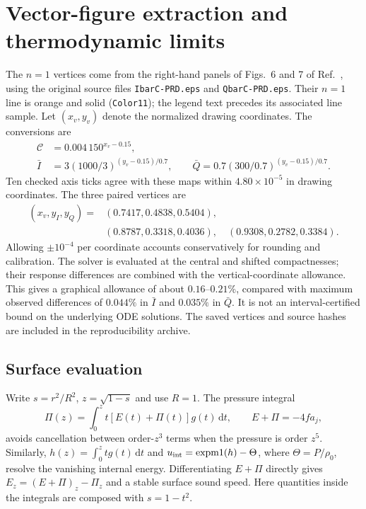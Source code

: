 \documentclass[10pt,a4paper]{article}
\newcommand{\dd}{\mathrm d}
\begin{document}
\clearpage
\section{Vector-figure extraction and thermodynamic limits}
The $n=1$ vertices come from the right-hand panels of Figs.~6 and 7 of Ref.~\cite{yy}, using the original source files \texttt{IbarC-PRD.eps} and \texttt{QbarC-PRD.eps}. Their $n=1$ line is orange and solid (\texttt{Color11}); the legend text precedes its associated line sample. Let $(x_v,y_v)$ denote the normalized drawing coordinates. The conversions are
\begin{align}
 \mathcal C&=0.004\,150^{x_v-0.15},\\
 \bar I&=3(1000/3)^{(y_v-0.15)/0.7},\qquad
 \bar Q=0.7(300/0.7)^{(y_v-0.15)/0.7}.
\end{align}
Ten checked axis ticks agree with these maps within $4.80\times10^{-5}$ in drawing coordinates. The three paired vertices are
\begin{align}
 (x_v,y_I,y_Q)={}&(0.7417,0.4838,0.5404),\nonumber\\
 &(0.8787,0.3318,0.4036),\quad(0.9308,0.2782,0.3384).
\end{align}
Allowing $\pm10^{-4}$ per coordinate accounts conservatively for rounding and calibration. The solver is evaluated at the central and shifted compactnesses; their response differences are combined with the vertical-coordinate allowance. This gives a graphical allowance of about $0.16$--$0.21\%$, compared with maximum observed differences of $0.044\%$ in $\bar I$ and $0.035\%$ in $\bar Q$. It is not an interval-certified bound on the underlying ODE solutions. The saved vertices and source hashes are included in the reproducibility archive.

\subsection*{Surface evaluation}
Write $s=r^2/R^2$, $z=\sqrt{1-s}$ and use $R=1$. The pressure integral
\begin{equation}
 \Pi(z)=\int_0^z t[E(t)+\Pi(t)]g(t)\,\dd t,
 \qquad E+\Pi=-4fa_j,
\end{equation}
avoids cancellation between order-$z^3$ terms when the pressure is order $z^5$. Similarly, $h(z)=\int_0^z t g(t)\,\dd t$ and $u_{\rm int}=\operatorname{expm1}(h)-\Theta$, where $\Theta=P/\rho_0$, resolve the vanishing internal energy. Differentiating $E+\Pi$ directly gives $E_z=(E+\Pi)_z-\Pi_z$ and a stable surface sound speed. Here quantities inside the integrals are composed with $s=1-t^2$.
\end{document}
